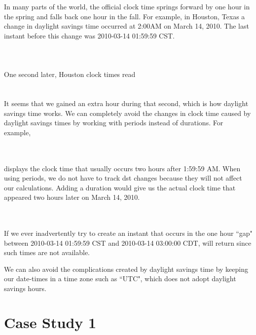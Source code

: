 \documentclass[article]{jss}
\begin{document}
In many parts of the world, the official clock time springs forward by one hour in the spring and falls back one hour in the fall. For example, in Houston, Texas a change in daylight savings time occurred at 2:00AM on March 14, 2010. The last instant before this change was 2010-03-14 01:59:59 CST.\\

\\
\\
\\

One second later, Houston clock times read\\

\\
\\

It seems that we gained an extra hour during that second, which is how daylight savings time works. We can completely avoid the changes in clock time caused by daylight savings times by working with periods instead of durations. For example,\

\\
\\

displays the clock time that usually occurs two hours after 1:59:59 AM. When using periods, we do not have to track dst changes because they will not affect our calculations. Adding a duration would give us the actual clock time that appeared two hours later on March 14, 2010.

\\
\\

If we ever inadvertently try to create an instant that occurs in the one hour ``gap" between 2010-03-14 01:59:59 CST  and 2010-03-14 03:00:00 CDT,  will return  since such times are not available.

We can also avoid the complications created by daylight savings time by keeping our date-times in a time zone such as ``UTC", which does not adopt daylight savings hours.

\section{Case Study 1}
\end{document}
